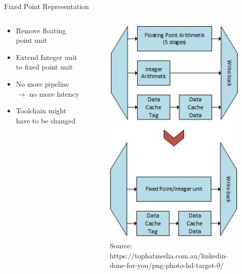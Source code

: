\documentclass{beamer}
\begin{document}
\begin{frame}{Fixed Point Representation}
\begin {columns}
 \begin{column}{0.7\textwidth}
 
    \begin{itemize}
        \item<1->Remove floating point unit
        \item<2->Extend Integer unit to fixed point unit
        \item<3->No more pipeline $\rightarrow$ no more latency
        \item<4->Toolchain might have to be changed
    \end{itemize}
    
 \end{column}
  \begin{column}{0.3\textwidth}
    \begin{figure}
     \includegraphics[width=\textwidth]{img/FixedPonitRepresentation.jpg}
     \caption{Source: https://tophatmedia.com.au/linkedin-done-for-you/png-photo-hd-target-0/}
    \end{figure}
  \end{column}
\end {columns}
\end{frame}
\end{document}
